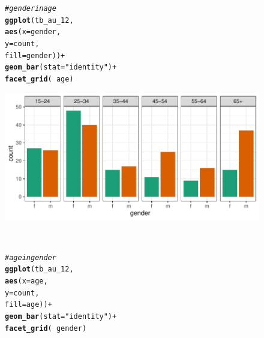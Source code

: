 \documentclass[letterpaper]{ar-1col}\usepackage[]{graphicx}\usepackage[]{color}
\makeatletter
\newcommand{\hlstr}[1]{\textcolor[rgb]{0.192,0.494,0.8}{#1}}%
\newcommand{\hlcom}[1]{\textcolor[rgb]{0.678,0.584,0.686}{\textit{#1}}}%
\newcommand{\hlopt}[1]{\textcolor[rgb]{0,0,0}{#1}}%
\newcommand{\hlstd}[1]{\textcolor[rgb]{0.345,0.345,0.345}{#1}}%
\newcommand{\hlkwc}[1]{\textcolor[rgb]{0.333,0.667,0.333}{#1}}%
\newcommand{\hlkwd}[1]{\textcolor[rgb]{0.737,0.353,0.396}{\textbf{#1}}}%
\newenvironment{kframe}{%
 \def\at@end@of@kframe{}%
 \ifinner\ifhmode%
  \def\at@end@of@kframe{\end{minipage}}%
  \begin{minipage}{\columnwidth}%
 \fi\fi%
 \def\FrameCommand##1{\hskip\@totalleftmargin \hskip-\fboxsep
 \colorbox{shadecolor}{##1}\hskip-\fboxsep
     \hskip-\linewidth \hskip-\@totalleftmargin \hskip\columnwidth}%
 \MakeFramed {\advance\hsize-\width
   \@totalleftmargin\z@ \linewidth\hsize
   \@setminipage}}%
 {\par\unskip\endMakeFramed%
 \at@end@of@kframe}
\newenvironment{knitrout}{}{} %
\makeatother
\begin{document}
\begin{figure}
\begin{minipage}{.345\textwidth}
\begin{knitrout}
\color{fgcolor}\begin{kframe}
\begin{alltt}
\hlcom{# gender in age}
\hlkwd{ggplot}\hlstd{(tb_au_12,}
       \hlkwd{aes}\hlstd{(}\hlkwc{x} \hlstd{= gender,}
           \hlkwc{y} \hlstd{= count,}
           \hlkwc{fill} \hlstd{= gender))} \hlopt{+}
  \hlkwd{geom_bar}\hlstd{(}\hlkwc{stat} \hlstd{=} \hlstr{"identity"}\hlstd{)} \hlopt{+}
  \hlkwd{facet_grid}\hlstd{(}\hlopt{~} \hlstd{age)}
\end{alltt}
\end{kframe}
\end{knitrout}
\end{minipage}\hfill
\begin{minipage}{.60\textwidth}
\includegraphics[width=.99\textwidth]{figure/tb-setup-1}
\end{minipage}\\
\begin{minipage}{.345\textwidth}
\begin{knitrout}
\color{fgcolor}\begin{kframe}
\begin{alltt}
\hlcom{# age in gender}
\hlkwd{ggplot}\hlstd{(tb_au_12,}
       \hlkwd{aes}\hlstd{(}\hlkwc{x} \hlstd{= age,}
           \hlkwc{y} \hlstd{= count,}
           \hlkwc{fill} \hlstd{= age))} \hlopt{+}
  \hlkwd{geom_bar}\hlstd{(}\hlkwc{stat} \hlstd{=} \hlstr{"identity"}\hlstd{)} \hlopt{+}
  \hlkwd{facet_grid}\hlstd{(}\hlopt{~} \hlstd{gender)}
\end{alltt}
\end{kframe}
\end{knitrout}
\end{minipage}\hfill

\end{figure}
\end{document}
